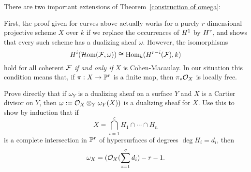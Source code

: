 \begin{fact}  There are two important extensions of Theorem~\ref{construction of omega}:

First, the proof given for curves above actually works for a purely $r$-dimensional projective scheme $X$ over $k$ if we replace the occurrences of  ${H}^{1}$ by ${H}^{r}$, and shows that every such scheme has a dualizing sheaf $\omega$. However, the isomorphisms
$$
{H}^{i} (\operatorname{{\mathcal H} om}({\mathcal F}, \omega)) \cong \operatorname{Hom}_{k}({H}^{r-i}({\mathcal F}), k) 
$$
hold for all coherent ${\mathcal F}$ \emph{ if and only if} $X$ is Cohen-Macaulay. In our situation
this condition means that, if $\pi: X\to {\mathbb P}^{r}$ is a finite map, then $\pi_{*}{\mathcal O}_{X}$
is locally free.
\end{fact}

 

\begin{exercise} Prove directly that if $\omega_{Y}$ is a dualizing sheaf on a surface $Y$ and $X$ is a Cartier divisor on $Y$, then
$\omega := {\mathcal O}_{X}\otimes_{Y}\omega_{Y}(X))$ is a dualizing sheaf for $X$.  
Use this to show by induction that if 
$$
X = \bigcap_{i=1}^{c}H_{1}\cap \cdots \cap H_{n}
$$ 
is a complete intersection
in ${\mathbb P}^{r}$ of hypersurfaces of degrees $\deg H_{i} = d_{i}$,  then
$$
\omega_{X} = ({\mathcal O}_{X}(\sum_{i=1}^{c} d_{i}) - r-1.
$$
\end{exercise}

